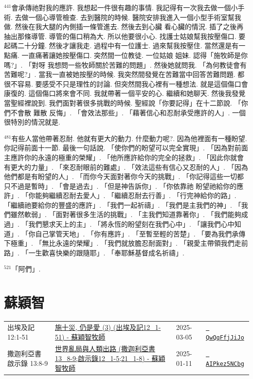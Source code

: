 \documentclass{book}
\begin{document}
$^{441}$會承傳祂對我的應許.
我想起一件很有趣的事情.
我記得有一次我去做一個小手術.
去做一個心導管檢查.
去到醫院的時候.
醫院安排我進入一個小型手術室幫我做.
然後在我大腿的內側插一條管進去.
然後去到心臟 看心臟的情況.
插了之後再抽出那條導管.
導管的傷口稍為大.
所以他要很小心.
找護士姑娘幫我按壓傷口.
要起碼二十分鐘.
然後才讓我走.
過程中有一位護士.
過來幫我按壓住.
當然還是有一點痛.
一直痛著讓她按壓傷口.
突然間一位教徒.
一位姑娘 姐妹.
認得「施牧師是你嗎?」.
「對呀 我想問一些牧師關於苦難的問題」.
然後她就問我.
「為何教徒會有苦難呢?」.
當我一直被她按壓的時候.
我突然間發覺在苦難當中回答苦難問題.
都很不容易.
要感受不只是理性的討論.
但突然間我心裡有一種想法.
就是這個傷口會康復的.
這個傷口將來會不同.
我就帶著一個平安的心.
繼續和她聊天.
然後我發覺當聖經裡說到.
我們面對著很多挑戰的時候.
聖經說「你要記得」在十二節說.
「你們不會散 難散 反悔」.
「會效法那些」.
「藉著信心和忍耐承受應許的人」.
一個很特別的情況就是.

$^{481}$有些人當他帶著忍耐.
他就有更大的動力.
什麼動力呢?.
因為他裡面有一種盼望.
你記得前面十一節.
最後一句話說.
「使你們的盼望可以完全實現」.
「因為對前面主應許你的永遠的極重的榮耀」.
「他所應許給你的完全的拯救」.
「因此你就會有更大的力量」.
「來忍耐眼前的難處」.
「效法這些有信心又忍耐的人」.
「因為他們都是有盼望的人」.
「而你今天面對著你今天的挑戰」.
「你記得這些一切都只不過是暫時」.
「會是過去」.
「但是神告訴你」.
「你依靠祂 盼望祂給你的應許」.
「你能夠繼續忍耐去愛人」.
「繼續忍耐去行善」.
「行完神給你的路」.
「繼續祂要給你的豐盛的應許」.
「我們一起祈禱」.
「我們是主我們的神」.
「我們雖然軟弱」.
「面對著很多生活的挑戰」.
「主我們知道靠著你」.
「我們能夠成過」.
「我們懇求天上的主」.
「將永恆的盼望刻在我們心中」.
「讓我們心中知道」.
「你自己掌管天地」.
「你有應許」.
「至暫至輕的苦楚」.
「要為我們承傳下極重」.
「無比永遠的榮耀」.
「我們就放膽忍耐面對」.
「親愛主帶領我們走前路」.
「一生歡喜快樂的跟隨耶」.
「奉耶穌基督成名祈禱」.

$^{521}$「阿們」.
\newpage



\chapter{蘇穎智}\label{ch:preacher8}
\begin{multicols}{3}
\minitoc
\end{multicols}
{ \scriptsize


\begin{xltabular}{\textwidth}{|p{0.15\textwidth} p{0.6\textwidth}|p{0.07\textwidth} p{0.1\textwidth}|}
\hline
出埃及記 12:1-51 & \hyperref[sec:QwQqFfjJiJo]{施十災, 仍是愛 (3) (出埃及記12\_1-51) -  蘇穎智牧師} & 2025-03-05 & \href{https://youtube.com/watch?v=QwQqFfjJiJo}{\texttt{ QwQqFfjJiJo}} \\
撒迦利亞書啟示錄 13:8-9 & \hyperref[sec:AIPkez5NCbg]{世界亂局與人類出路 (撒迦利亞書13\_8-9;啟示錄12\_1-5;21\_1-8) -  蘇穎智牧師} & 2025-01-11 & \href{https://youtube.com/watch?v=AIPkez5NCbg}{\texttt{ AIPkez5NCbg}} \\
\hline
\end{xltabular}
}
\newpage
\end{document}
